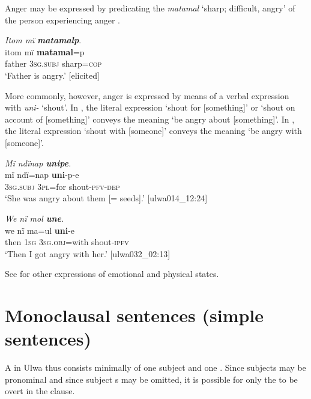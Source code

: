 Anger may be expressed by predicating the  \textit{matamal} ‘sharp; difficult, angry’ of the person experiencing anger .

\ea%
    \label{ex:clause:94}
          \textit{Itom mï} \textbf{\textit{matamalp}}.\\
\gll itom  mï      \textbf{matamal}=p\\
    father  3\textsc{sg.subj}  sharp=\textsc{cop}\\
\glt `Father is angry.’ [elicited]
\z

More commonly, however, anger is expressed by means of a verbal expression with \textit{uni-} ‘shout’. In , the literal expression ‘shout for [something]’ or ‘shout on account of [something]’ conveys the meaning ‘be angry about [something]’. In , the literal expression ‘shout with [someone]’ conveys the meaning ‘be angry with [someone]’.

\ea%
    \label{ex:clause:95}
          \textit{Mï ndïnap \textbf{unipe}.}\\
\gll    mï      ndï=nap  \textbf{uni}-p-e\\
    3\textsc{sg.subj}  \textsc{3pl}=for  shout-\textsc{pfv-dep}\\
\glt `She was angry about them [= seeds].’ [ulwa014\_12:24]
\z

\ea%
    \label{ex:clause:96}
        \textit{We nï mol \textbf{une}.}\\
\gll    we    nï    ma=ul      \textbf{uni}-e\\
    then  1\textsc{sg}  3\textsc{sg.obj}=with  shout-\textsc{ipfv}\\
\glt `Then I got angry with her.’ [ulwa032\_02:13]
\z

See  for other expressions of emotional and physical states.


\section{Monoclausal sentences (simple sentences)}\label{sec:11.6}


A  in Ulwa thus consists minimally of one subject and one . Since subjects may be pronominal and since subject s may be omitted, it is possible for only the  to be overt in the clause.

